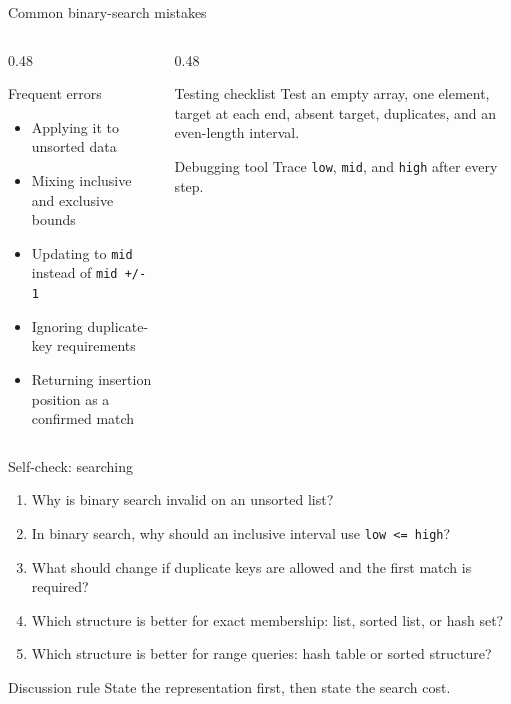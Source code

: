 \documentclass[aspectratio=169]{beamer}
\begin{document}
\begin{frame}{Common binary-search mistakes}
  \begin{columns}[T]
    \begin{column}{0.48\textwidth}
      \begin{alertblock}{Frequent errors}
        \begin{itemize}
          \item Applying it to unsorted data
          \item Mixing inclusive and exclusive bounds
          \item Updating to \texttt{mid} instead of \texttt{mid +/- 1}
          \item Ignoring duplicate-key requirements
          \item Returning insertion position as a confirmed match
        \end{itemize}
      \end{alertblock}
    \end{column}
    \begin{column}{0.48\textwidth}
      \begin{exampleblock}{Testing checklist}
        Test an empty array, one element, target at each end, absent target,
        duplicates, and an even-length interval.
      \end{exampleblock}
      \begin{block}{Debugging tool}
        Trace \texttt{low}, \texttt{mid}, and \texttt{high} after every step.
      \end{block}
    \end{column}
  \end{columns}
\end{frame}


\begin{frame}{Self-check: searching}
  \small
  \begin{enumerate}
    \item Why is binary search invalid on an unsorted list?
    \item In binary search, why should an inclusive interval use \texttt{low <= high}?
    \item What should change if duplicate keys are allowed and the first match is required?
    \item Which structure is better for exact membership: list, sorted list, or hash set?
    \item Which structure is better for range queries: hash table or sorted structure?
  \end{enumerate}
  \begin{block}{Discussion rule}
    State the representation first, then state the search cost.
  \end{block}
\end{frame}
\end{document}
